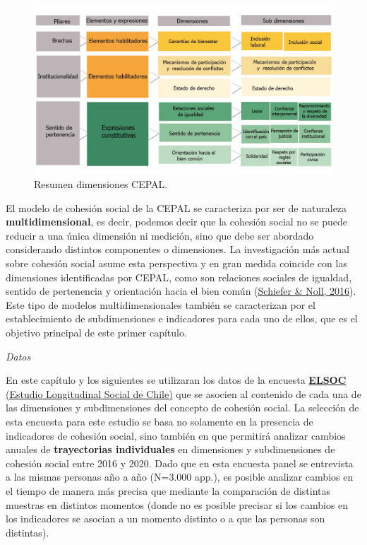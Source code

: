 \documentclass[
  12pt,
]{book}
\begin{document}
\begin{figure}[H]

{\centering \includegraphics[width=1\linewidth,height=1\textheight]{images/dimensiones-cepal} 

}

\caption{Resumen dimensiones CEPAL.}\label{fig:esquema-cepal}
\end{figure}

El modelo de cohesión social de la CEPAL se caracteriza por ser de naturaleza \textbf{multidimensional}, es decir, podemos decir que la cohesión social no se puede reducir a una única dimensión ni medición, sino que debe ser abordado considerando distintos componentes o dimensiones. La investigación más actual sobre cohesión social asume esta perspectiva y en gran medida coincide con las dimensiones identificadas por CEPAL, como son relaciones sociales de igualdad, sentido de pertenencia y orientación hacia el bien común (\protect\hyperlink{ref-schiefer_essentials_2016}{Schiefer \& Noll, 2016}). Este tipo de modelos multidimensionales también se caracterizan por el establecimiento de subdimensiones e indicadores para cada uno de ellos, que es el objetivo principal de este primer capítulo.

\emph{Datos}

En este capítulo y los siguientes se utilizaran los datos de la encuesta \href{https://coes.cl/encuesta-panel/}{\textbf{ELSOC} (Estudio Longitudinal Social de Chile)} que se asocien al contenido de cada una de las dimensiones y subdimensiones del concepto de cohesión social. La selección de esta encuesta para este estudio se basa no solamente en la presencia de indicadores de cohesión social, sino también en que permitirá analizar cambios anuales de \textbf{trayectorias individuales} en dimensiones y subdimensiones de cohesión social entre 2016 y 2020. Dado que en esta encuesta panel se entrevista a las mismas personas año a año (N=3.000 app.), es posible analizar cambios en el tiempo de manera más precisa que mediante la comparación de distintas muestras en distintos momentos (donde no es posible precisar si los cambios en los indicadores se asocian a un momento distinto o a que las personas son distintas).
\end{document}
